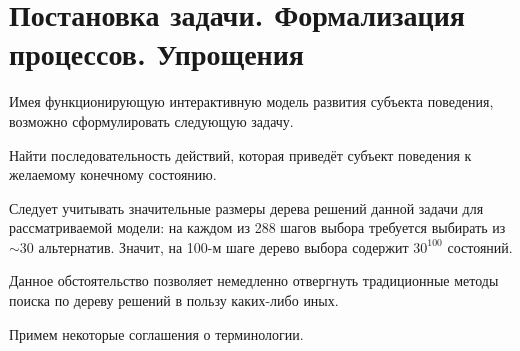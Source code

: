 \chapter{Постановка задачи. Формализация процессов. Упрощения}
Имея функционирующую интерактивную модель развития субъекта поведения, возможно сформулировать следующую задачу.

Найти последовательность действий, которая приведёт субъект поведения к желаемому конечному состоянию.

Следует учитывать значительные размеры дерева решений данной задачи для рассматриваемой модели: на каждом из 288 шагов выбора требуется выбирать из $\sim 30$ альтернатив. Значит, на 100-м шаге дерево выбора содержит $30^{100}$ состояний.

Данное обстоятельство позволяет немедленно отвергнуть традиционные методы поиска по дереву решений в пользу каких-либо иных.

Примем некоторые соглашения о терминологии.

